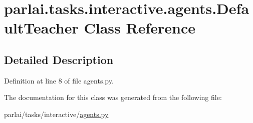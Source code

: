 \hypertarget{classparlai_1_1tasks_1_1interactive_1_1agents_1_1DefaultTeacher}{}\section{parlai.\+tasks.\+interactive.\+agents.\+Default\+Teacher Class Reference}
\label{classparlai_1_1tasks_1_1interactive_1_1agents_1_1DefaultTeacher}


\subsection{Detailed Description}


Definition at line 8 of file agents.\+py.



The documentation for this class was generated from the following file\+:\begin{DoxyCompactItemize}
\item 
parlai/tasks/interactive/\hyperlink{parlai_2tasks_2interactive_2agents_8py}{agents.\+py}\end{DoxyCompactItemize}
